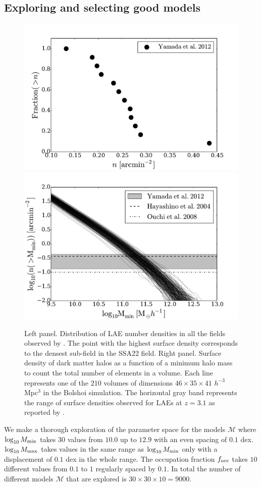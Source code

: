 \documentclass[usenatbib]{mn2e}
\begin{document}
\subsection{Exploring and selecting good models}


\begin{figure}
\begin{center}
\includegraphics[width=0.45\linewidth,angle=0]{Fig1b.pdf}
\includegraphics[width=0.45\linewidth,angle=0]{Fig1.pdf}
\caption{ \label{fig:halos} Left panel. Distribution of LAE number
  densities in all the fields observed by \citet{Yamada2012}. The
  point with the highest surface density corresponds to the densest
  sub-field in the SSA22 field. Right panel. Surface density of dark 
  matter halos as a function of a minimum halo mass to count the
  total number of elements in a volume. Each line represents one of the
  $210$ volumes of dimensions $46\times 35\times 41$ $h^{-3}$ Mpc$^{3}$
  in the Bolshoi simulation. The horizontal gray band represents the
  range of surface densities observed for LAEs at $z=3.1$ as reported
  by \citep{Yamada2012}.}
\end{center} 
\end{figure}


We make a thorough exploration of the parameter space for the models
${\mathcal M}$ where $\log_{10} M_{\rm min}$ takes $30$ values from $10.0$ up
to $12.9$ with an even spacing of $0.1$ dex. $\log_{10} M_{\rm max}$
takes values in the same range as $\log_{10}M_{\rm min}$ only with a
displacement of $0.1$ dex in the whole range. The occupation fraction
$f_{\rm occ}$ takes $10$ different values from $0.1$ to $1$ regularly
spaced by $0.1$. In total the number of different models ${\mathcal
  M}$ that are explored is $30 \times 30 \times 10 = 9000$. 
\end{document}
